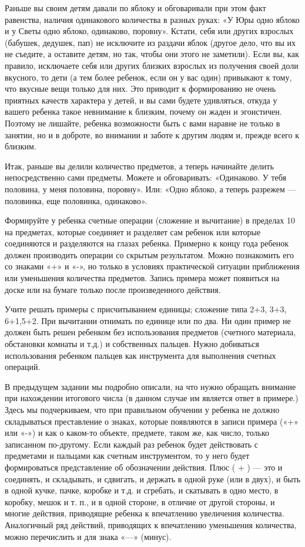 \documentclass{book}
\begin{document}
Раньше вы своим детям давали по яблоку и обговаривали при этом факт
равенства, наличия одинакового количества в разных руках: «У Юры одно
яблоко и у Светы одно яблоко, одинаково, поровну». Кстати, себя или
других взрослых (бабушек, дедушек, пап) не исключите из раздачи яблок
(другое дело, что вы их не съедите, а оставите детям, но так, чтобы они
этого не заметили). Если вы, как правило, исключаете себя или других
близких взрослых из получения своей доли вкусного, то дети (а тем более
ребенок, если он у вас один) привыкают к тому, что вкусные вещи только
для них. Это приводит к формированию не очень приятных качеств характера
у детей, и вы сами будете удивляться, откуда у вашего ребенка такое
невнимание к близким, почему он жаден и эгоистичен. Поэтому не лишайте,
ребенка возможности быть с вами наравне не только в занятии, но и в
доброте, во внимании и заботе к другим людям и, прежде всего к близким.

Итак, раньше вы делили количество предметов, а теперь начинайте делить
непосредственно сами предметы. Можете и обговаривать: «Одинаково. У тебя
половина, у меня половина, поровну». Или: «Одно яблоко, а теперь
разрежем --- половинка, еще половинка, одинаково».

Формируйте у ребенка счетные операции (сложение и вычитание) в пределах
10 на предметах, которые соединяет и разделяет сам ребенок или которые
соединяются и разделяются на глазах ребенка. Примерно к концу года
ребенок должен производить операции со скрытым результатом. Можно
познакомить его со знаками «+» и «-», но только в условиях практической
ситуации приближения или уменьшения количества предметов. Запись примера
может появиться на доске или на бумаге только после произведенного
действия.

Учите решать примеры с присчитыванием единицы; сложение типа 2+3, 3+3,
6+1,5+2. При вычитании отнимать по единице или по два. Ни один пример не
должен быть решен ребенком без использования предметов (счетного
материала, обстановки комнаты и т.д.) и собственных пальцев. Нужно
добиваться использования ребенком пальцев как инструмента для выполнения
счетных операций.

В предыдущем задании мы подробно описали, на что нужно обращать внимание
при нахождении итогового числа (в данном случае им является ответ в
примере.) Здесь мы подчеркиваем, что при правильном обучении у ребенка
не должно складываться преставление о знаках, которые появляются в
записи примера («+» или «-») и как о каком-то объекте, предмете, таком
же, как число, только записанном по-другому. Если каждый раз ребенок
будет действовать с предметами и пальцами как счетным инструментом, то у
него будет формироваться представление об обозначении действия. Плюс ( +
) --- это и соединять, и складывать, и сдвигать, и держать в одной руке
(или в двух), и быть в одной кучке, пачке, коробке и т.д. и сгребать, и
скатывать в одно место, в коробку, мешок и т. п., и в одной стороне, в
отличие от другой стороны, и многие действия, приводящие ребенка к
впечатлению увеличения количества. Аналогичный ряд действий, приводящих
к впечатлению уменьшения количества, можно перечислить и для знака «---»
(минус).
\end{document}

